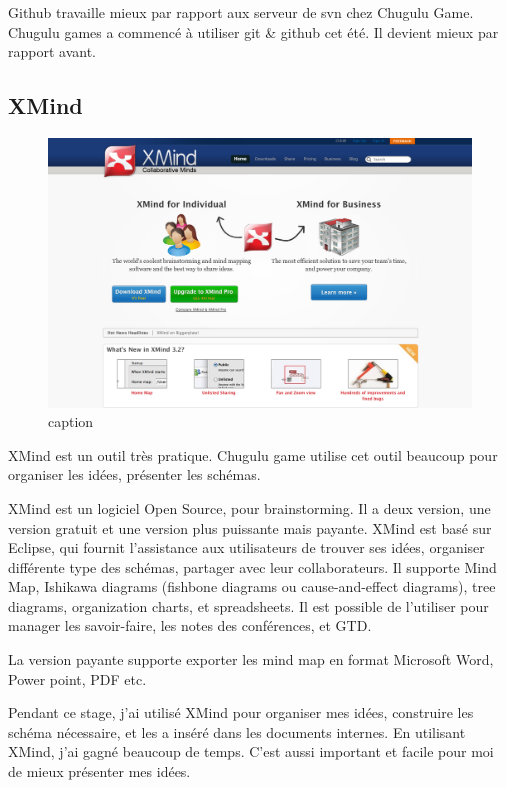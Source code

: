 Github travaille mieux par rapport aux serveur de svn chez Chugulu Game. Chugulu games a commencé à utiliser git \& github cet été. Il devient mieux par rapport avant.


\subsection{XMind} %


\begin{figure}[htbp]
	\centering
		\includegraphics[width=6in]{Image/Xmind.png}
	\caption{caption}
	\label{fig:Image_Xmind}
\end{figure}

XMind est un outil très pratique. Chugulu game utilise cet outil beaucoup pour organiser les idées, présenter les schémas. 

XMind est un logiciel Open Source, pour brainstorming. Il a deux version, une version gratuit et une version plus puissante mais payante. XMind est basé sur Eclipse, qui fournit l'assistance aux utilisateurs de trouver ses idées, organiser différente type des schémas, partager avec leur collaborateurs. Il supporte Mind Map, Ishikawa diagrams (fishbone diagrams ou cause-and-effect diagrams), tree diagrams, organization charts, et spreadsheets. Il est possible de l'utiliser pour manager les savoir-faire, les notes des conférences, et GTD. 

La version payante supporte exporter les mind map en format Microsoft Word, Power point, PDF etc.

Pendant ce stage, j'ai utilisé XMind pour organiser mes idées, construire les schéma nécessaire, et les a inséré dans les documents internes. En utilisant XMind, j'ai gagné beaucoup de temps. C'est aussi important et facile pour moi de mieux présenter mes idées.

